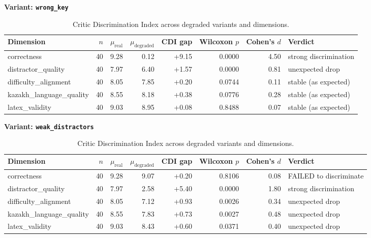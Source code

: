 \begin{table}[t]
\centering
\caption{Critic Discrimination Index across degraded variants and dimensions.}
\label{tab:cdi}
\vspace{0.5em}
\textbf{Variant: \texttt{wrong_key}}\\
\begin{tabular}{lrrrrrrl}
\hline
Dimension & $n$ & $\mu_\text{real}$ & $\mu_\text{degraded}$ & CDI gap & Wilcoxon $p$ & Cohen's $d$ & Verdict \\
\hline
correctness & 40 & 9.28 & 0.12 & +9.15 & 0.0000 & 4.50 & strong discrimination \\
distractor\_quality & 40 & 7.97 & 6.40 & +1.57 & 0.0000 & 0.81 & unexpected drop \\
difficulty\_alignment & 40 & 8.05 & 7.85 & +0.20 & 0.0744 & 0.11 & stable (as expected) \\
kazakh\_language\_quality & 40 & 8.55 & 8.18 & +0.38 & 0.0776 & 0.28 & stable (as expected) \\
latex\_validity & 40 & 9.03 & 8.95 & +0.08 & 0.8488 & 0.07 & stable (as expected) \\
\hline
\end{tabular}
\vspace{0.5em}
\textbf{Variant: \texttt{weak_distractors}}\\
\begin{tabular}{lrrrrrrl}
\hline
Dimension & $n$ & $\mu_\text{real}$ & $\mu_\text{degraded}$ & CDI gap & Wilcoxon $p$ & Cohen's $d$ & Verdict \\
\hline
correctness & 40 & 9.28 & 9.07 & +0.20 & 0.8106 & 0.08 & FAILED to discriminate \\
distractor\_quality & 40 & 7.97 & 2.58 & +5.40 & 0.0000 & 1.80 & strong discrimination \\
difficulty\_alignment & 40 & 8.05 & 7.12 & +0.93 & 0.0026 & 0.34 & unexpected drop \\
kazakh\_language\_quality & 40 & 8.55 & 7.83 & +0.73 & 0.0027 & 0.48 & unexpected drop \\
latex\_validity & 40 & 9.03 & 8.43 & +0.60 & 0.0371 & 0.40 & unexpected drop \\
\hline
\end{tabular}
\end{table}
